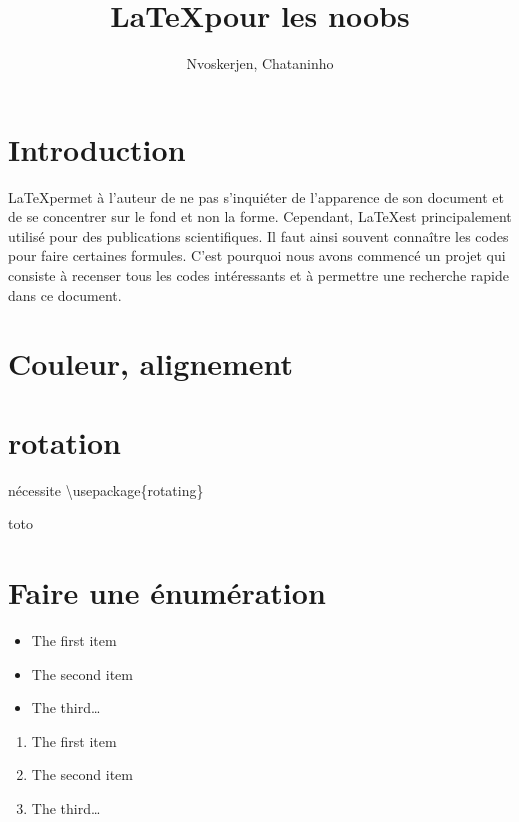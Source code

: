 \documentclass{article}
\begin{document}
\title{\LaTeX pour les noobs}
\author{Nvoskerjen, Chataninho}
\maketitle


\vspace{40mm}





\pagebreak

\section{Introduction}


\LaTeX permet à l'auteur de ne pas s'inquiéter de l'apparence de son document et de se concentrer sur le fond et non la forme. Cependant, \LaTeX est principalement utilisé pour des publications scientifiques. Il faut ainsi souvent connaître les codes pour faire certaines formules. C'est pourquoi nous avons commencé un projet qui consiste à recenser tous les codes intéressants et à permettre une recherche rapide dans ce document.
\section{Couleur, alignement}

\section{rotation}
nécessite \textbackslash usepackage\{rotating\}
\begin{turn}{30}
toto
\end{turn}
\section{Faire une énumération}
\begin{itemize}
\item The first item
\item The second item
\item The third\ldots
\end{itemize}

\begin{enumerate}
\item The first item
\item The second item
\item The third\ldots
\end{enumerate}
\end{document}
